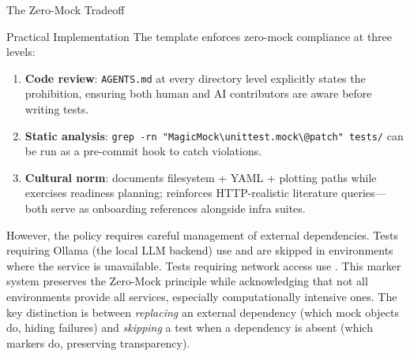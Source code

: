 \documentclass[
  ignorenonframetext,
]{beamer}
\providecommand{\tightlist}{%
  \setlength{\itemsep}{0pt}\setlength{\parskip}{0pt}}
\begin{document}
\begin{frame}{The Zero-Mock Tradeoff}
\begin{block}{Practical Implementation}
\protect{}\label{practical-implementation}
The template enforces zero-mock compliance at three levels:

\begin{enumerate}
\tightlist
\item
  \textbf{Code review}: \texttt{AGENTS.md} at every directory level
  explicitly states the prohibition, ensuring both human and AI
  contributors are aware before writing tests.
\item
  \textbf{Static analysis}:
  \texttt{grep\ -rn\ "MagicMock\textbackslash{}\textbar{}unittest.mock\textbackslash{}\textbar{}@patch"\ tests/}
  can be run as a pre-commit hook to catch violations.
\item
  \textbf{Cultural norm}:  documents
  filesystem + YAML + plotting paths while
   exercises readiness planning;
   reinforces HTTP-realistic
  literature queries---both serve as onboarding references alongside
  infra suites.
\end{enumerate}

However, the policy requires careful management of external
dependencies. Tests requiring Ollama (the local LLM backend) use
 and are skipped in environments
where the service is unavailable. Tests requiring network access use
. This marker system preserves the
Zero-Mock principle while acknowledging that not all environments
provide all services, especially computationally intensive ones. The key
distinction is between \emph{replacing} an external dependency (which
mock objects do, hiding failures) and \emph{skipping} a test when a
dependency is absent (which markers do, preserving transparency).
\end{block}
\end{frame}
\end{document}
